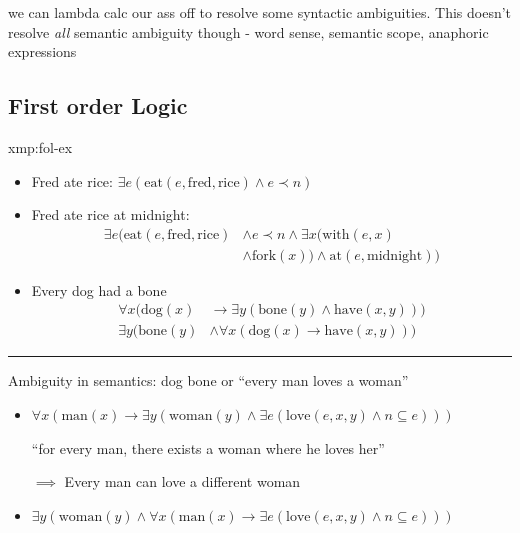 \documentclass[landscape, 8pt]{extarticle}
\begin{document}
\begin{multicols}{3}
we can lambda calc our ass off to resolve some syntactic ambiguities. This doesn't resolve \textit{all} semantic ambiguity though - word sense, semantic scope, anaphoric expressions

\subsection{First order Logic}
\begin{xmp}{xmp:fol-ex}{}
    \begin{itemize}
        \setlength\itemsep{0em}
        \item Fred ate rice: $\exists e(\text{eat}(e, \text{fred}, \text{rice})\wedge e \prec n)$
        \item Fred ate rice at midnight:
            \begin{align*}
                \exists e(\text{eat}(e, \text{fred}, \text{rice}) &\wedge e \prec n \wedge \exists x(\text{with}(e, x)  \\
                                                                                             &\wedge \text{fork}(x)) \wedge \text{at}(e, \text{midnight}))
            \end{align*}
        \item Every dog had a bone
            \begin{align*}
                \forall x(\text{dog}(x) &\to \exists y(\text{bone}(y) \wedge \text{have}(x, y))) \\
                \exists y(\text{bone}(y) &\wedge \forall x(\text{dog}(x) \to \text{have}(x, y)))
            \end{align*}
    \end{itemize}

    \noindent\rule{\textwidth}{0.2pt}
    Ambiguity in semantics: dog bone or ``every man loves a woman''
    \begin{itemize}
        \setlength\itemsep{0em}
        \item $\forall x(\text{man}(x) \to \exists y(\text{woman}(y) \wedge \exists e(\text{love}(e, x, y) \wedge n \subseteq e)))$
            
        ``for every man, there exists a woman where he loves her''

        $\implies$ Every man can love a different woman
        \item $\exists y(\text{woman}(y) \wedge \forall x(\text{man}(x) \to \exists e(\text{love}(e, x, y) \wedge n \subseteq e)))$


\end{itemize}
\end{xmp}
\end{multicols}
\end{document}
